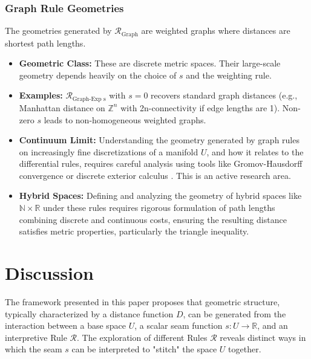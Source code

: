 \documentclass[twoside,twocolumn]{article}
\numberwithin{equation}{section} %
\begin{document}
\subsubsection{Graph Rule Geometries}
The geometries generated by \( \mathcal{R}_{\text{Graph}} \) are weighted graphs where distances are shortest path lengths.
\begin{itemize}
    \item \textbf{Geometric Class:} These are discrete metric spaces. Their large-scale geometry depends heavily on the choice of \( s \) and the weighting rule.
    \item \textbf{Examples:} \( \mathcal{R}_{\text{Graph-Exp s}} \) with \( s=0 \) recovers standard graph distances (e.g., Manhattan distance on \( \mathbb{Z}^n \) with 2n-connectivity if edge lengths are 1). Non-zero \( s \) leads to non-homogeneous weighted graphs.
    \item \textbf{Continuum Limit:} Understanding the geometry generated by graph rules on increasingly fine discretizations of a manifold \( U \), and how it relates to the differential rules, requires careful analysis using tools like Gromov-Hausdorff convergence or discrete exterior calculus \cite{Ollivier2009,BobenkoSpringborn2007}. %
    This is an active research area.
    \item \textbf{Hybrid Spaces:} Defining and analyzing the geometry of hybrid spaces like \( \mathbb{N} \times \mathbb{R} \) under these rules requires rigorous formulation of path lengths combining discrete and continuous costs, ensuring the resulting distance satisfies metric properties, particularly the triangle inequality.
\end{itemize}


\setcounter{equation}{0} %
\section{Discussion}

The framework presented in this paper proposes that geometric structure, typically characterized by a distance function $D$, can be generated from the interaction between a base space $U$, a scalar seam function $s: U \to \mathbb{R}$, and an interpretive Rule $\mathcal{R}$. The exploration of different Rules $\mathcal{R}$ reveals distinct ways in which the seam $s$ can be interpreted to "stitch" the space $U$ together.
\end{document}

